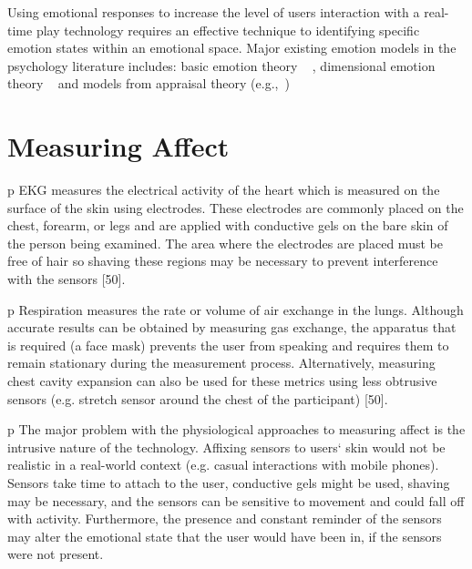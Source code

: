 \documentclass{uofsthesis-cs}
\begin{document}
Using emotional responses to increase the level of users interaction with a real-time play technology requires an effective technique to identifying specific emotion states within an emotional space. Major existing emotion models in the psychology literature includes: basic emotion theory ~\cite{ekman1992argument, ekman1992there} , dimensional emotion theory ~\cite{lang1995emotion, russell1980circumplex} and models from appraisal theory (e.g.,~\cite{roseman2001model}) ~\cite{zhang2010service}


\section{Measuring Affect}

p EKG measures the electrical activity of the heart which is measured on the surface of the skin using electrodes. These electrodes are commonly placed on the chest, forearm, or legs and are applied with conductive gels on the bare skin of the person being examined. The area where the electrodes are placed must be free of hair so shaving these regions may be necessary to prevent interference with the sensors [50].  

p Respiration measures the rate or volume of air exchange in the lungs. Although accurate results can be obtained by measuring gas exchange, the apparatus that is required (a face mask) prevents the user from speaking and requires them to remain stationary during the measurement process. Alternatively, measuring chest cavity expansion can also be used for these metrics using less obtrusive sensors (e.g. stretch sensor around the chest of the participant) [50].  

p The major problem with the physiological approaches to measuring affect is the intrusive nature of the technology. Affixing sensors to users‘ skin would not be realistic in a real-world context (e.g. casual interactions with mobile phones). Sensors take time to attach to the user, conductive gels might be used, shaving may be necessary, and the sensors can be sensitive to movement and could fall off with activity. Furthermore, the presence and constant reminder of the sensors may alter the emotional state that the user would have been in, if the sensors were not present. 
\end{document}
